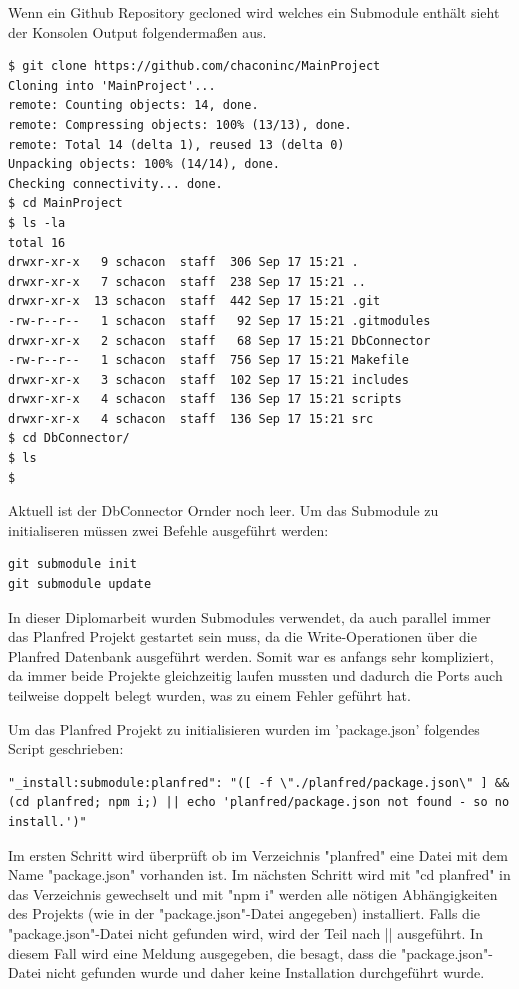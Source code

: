 Wenn ein Github Repository gecloned wird welches ein Submodule enthält sieht der Konsolen Output folgendermaßen aus. 
\begin{lstlisting}
$ git clone https://github.com/chaconinc/MainProject
Cloning into 'MainProject'...
remote: Counting objects: 14, done.
remote: Compressing objects: 100% (13/13), done.
remote: Total 14 (delta 1), reused 13 (delta 0)
Unpacking objects: 100% (14/14), done.
Checking connectivity... done.
$ cd MainProject
$ ls -la
total 16
drwxr-xr-x   9 schacon  staff  306 Sep 17 15:21 .
drwxr-xr-x   7 schacon  staff  238 Sep 17 15:21 ..
drwxr-xr-x  13 schacon  staff  442 Sep 17 15:21 .git
-rw-r--r--   1 schacon  staff   92 Sep 17 15:21 .gitmodules
drwxr-xr-x   2 schacon  staff   68 Sep 17 15:21 DbConnector
-rw-r--r--   1 schacon  staff  756 Sep 17 15:21 Makefile
drwxr-xr-x   3 schacon  staff  102 Sep 17 15:21 includes
drwxr-xr-x   4 schacon  staff  136 Sep 17 15:21 scripts
drwxr-xr-x   4 schacon  staff  136 Sep 17 15:21 src
$ cd DbConnector/
$ ls
$
\end{lstlisting}

Aktuell ist der DbConnector Ornder noch leer. Um das Submodule zu initialiseren müssen zwei Befehle ausgeführt werden:

\begin{lstlisting}
git submodule init
git submodule update
\end{lstlisting}

In dieser Diplomarbeit wurden Submodules verwendet, da auch parallel immer das Planfred Projekt gestartet sein muss, da die Write-Operationen über die Planfred Datenbank ausgeführt werden. Somit war es anfangs sehr kompliziert, da immer beide Projekte gleichzeitig laufen mussten und dadurch die Ports auch teilweise doppelt belegt wurden, was zu einem Fehler geführt hat.

Um das Planfred Projekt zu initialisieren wurden im 'package.json' folgendes Script geschrieben:

\begin{lstlisting}
"_install:submodule:planfred": "([ -f \"./planfred/package.json\" ] && (cd planfred; npm i;) || echo 'planfred/package.json not found - so no install.')"
\end{lstlisting}

Im ersten Schritt wird überprüft ob im Verzeichnis "planfred" eine Datei mit dem Name "package.json" vorhanden ist. Im nächsten Schritt wird mit "cd planfred" in das Verzeichnis gewechselt und mit "npm i" werden alle nötigen Abhängigkeiten des Projekts (wie in der "package.json"-Datei angegeben) installiert. Falls die "package.json"-Datei nicht gefunden wird, wird der Teil nach || ausgeführt. In diesem Fall wird eine Meldung ausgegeben, die besagt, dass die "package.json"-Datei nicht gefunden wurde und daher keine Installation durchgeführt wurde.

